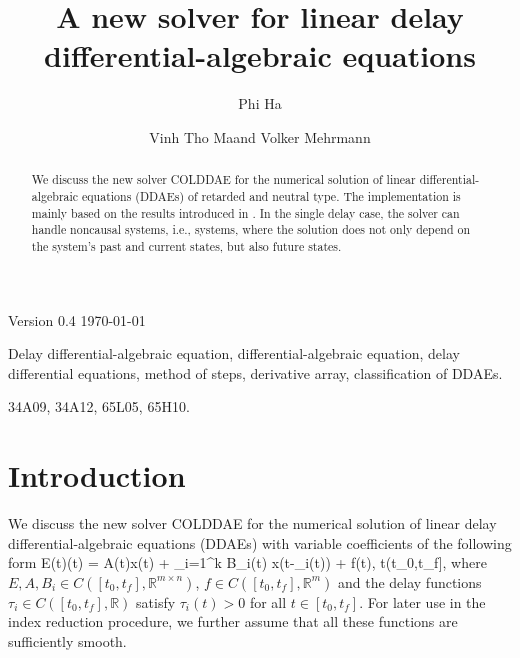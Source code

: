 \documentclass[final,reqno]{siamltex}
\begin{document}
\title{A new solver for linear delay differential-algebraic equations\footnotemark[1]}

\author{Phi Ha\footnotemark[2] \and Vinh Tho Ma\footnotemark[2] and Volker Mehrmann\footnotemark[2]}

\renewcommand{\thefootnote}{\fnsymbol{footnote}}


\maketitle

\newcommand{\thedate}{Version 0.4 \quad \today}

\begin{center}
\thedate
\end{center}

\vskip 0.2cm

\begin{abstract}
We discuss the new solver COLDDAE for the numerical solution of linear differential-algebraic equations (DDAEs) of retarded and neutral type. The implementation is mainly based on the results introduced in \cite{HaM14}. In the single delay case, the solver can handle noncausal systems, i.e., systems, where the solution does not only depend on the system's past and current states, but also future states.
\end{abstract}

\begin{keywords} Delay differential-algebraic equation, differential-algebraic equation, delay differential equations, method of steps, derivative array, classification of DDAEs.
\end{keywords}

\begin{AMS}
34A09, 34A12, 65L05, 65H10.
\end{AMS}

\pagestyle{myheadings}
\thispagestyle{plain}

\section{Introduction}
We discuss the new solver COLDDAE for the numerical solution of linear delay differential-algebraic equations (DDAEs) with variable coefficients of the following form
%
\bsq\label{eq1.1}
\be\label{eq1.1a}
 E(t)(t) = A(t)x(t) + \sum_{i=1}^k B_i(t) x(t-\tau_i(t)) + f(t), \quad t\in (t_0,t_f],
\ee
%
where $E,A, B_i \in C([t_0,t_f],\mathbb{R}^{m\times n})$,
$f\in C([t_0,t_f],\mathbb{R}^{m})$ and 
the delay functions $\tau_i \in C([t_0,t_f],\mathbb{R})$ satisfy $\tau_i(t) > 0$ for all 
$t\in [t_0,t_f]$. For later use in the index reduction procedure, we further assume that all these functions are sufficiently smooth. 
\end{document}
